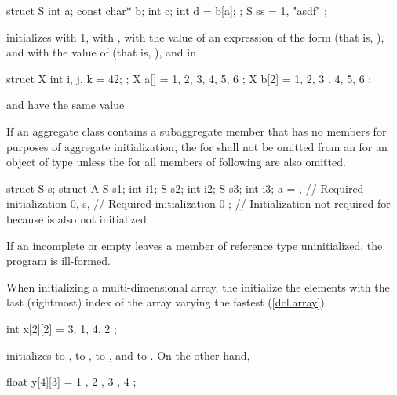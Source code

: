 \begin{codeblock}
struct S { int a; const char* b; int c; int d = b[a]; };
S ss = { 1, "asdf" };
\end{codeblock}

initializes
with 1,
with ,
with the value of an expression of the form
(that is, ), and  with the value of 
(that is, ), and in

\begin{codeblock}
struct X { int i, j, k = 42; };
X a[] = { 1, 2, 3, 4, 5, 6 };
X b[2] = { { 1, 2, 3 }, { 4, 5, 6 } };
\end{codeblock}

 and  have the same value
\exitexample

\pnum
If an aggregate class  contains a subaggregate member
 that has no members for purposes of aggregate initialization,
the  for  shall not be
omitted from an  for an object of type
 unless the  for all
members of  following  are also omitted.
\enterexample

\begin{codeblock}
struct S { } s;
struct A {
  S s1;
  int i1;
  S s2;
  int i2;
  S s3;
  int i3;
} a = {
  { },      // Required initialization
  0,
  s,        // Required initialization
  0
};          // Initialization not required for  because  is also not initialized
\end{codeblock}
\exitexample

\pnum
If an incomplete or empty
leaves a member of reference type uninitialized, the program is ill-formed.

\pnum
When initializing a multi-dimensional array,
the
initialize the elements with the last (rightmost) index of the array
varying the fastest (\ref{dcl.array}).
\enterexample

\begin{codeblock}
int x[2][2] = { 3, 1, 4, 2 };
\end{codeblock}

initializes
to
,
to
,
to
,
and
to
.
On the other hand,

\begin{codeblock}
float y[4][3] = {
  { 1 }, { 2 }, { 3 }, { 4 }
};
\end{codeblock}

